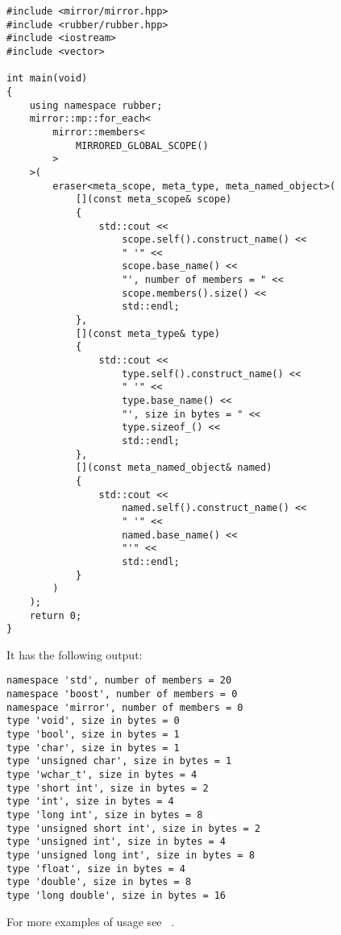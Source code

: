 \begin{verbatim}
#include <mirror/mirror.hpp>
#include <rubber/rubber.hpp>
#include <iostream>
#include <vector>

int main(void)
{
    using namespace rubber;
    mirror::mp::for_each<
        mirror::members<
            MIRRORED_GLOBAL_SCOPE()
        >
    >(
        eraser<meta_scope, meta_type, meta_named_object>(
            [](const meta_scope& scope)
            {
                std::cout <<
                    scope.self().construct_name() <<
                    " '" <<
                    scope.base_name() <<
                    "', number of members = " <<
                    scope.members().size() <<
                    std::endl;
            },
            [](const meta_type& type)
            {
                std::cout <<
                    type.self().construct_name() <<
                    " '" <<
                    type.base_name() <<
                    "', size in bytes = " <<
                    type.sizeof_() <<
                    std::endl;
            },
            [](const meta_named_object& named)
            {
                std::cout <<
                    named.self().construct_name() <<
                    " '" <<
                    named.base_name() <<
                    "'" <<
                    std::endl;
            }
        )
    );
    return 0;
}
\end{verbatim}

It has the following output:

\begin{verbatim}
namespace 'std', number of members = 20
namespace 'boost', number of members = 0
namespace 'mirror', number of members = 0
type 'void', size in bytes = 0
type 'bool', size in bytes = 1
type 'char', size in bytes = 1
type 'unsigned char', size in bytes = 1
type 'wchar_t', size in bytes = 4
type 'short int', size in bytes = 2
type 'int', size in bytes = 4
type 'long int', size in bytes = 8
type 'unsigned short int', size in bytes = 2
type 'unsigned int', size in bytes = 4
type 'unsigned long int', size in bytes = 8
type 'float', size in bytes = 4
type 'double', size in bytes = 8
type 'long double', size in bytes = 16
\end{verbatim}

For more examples of usage see ~\cite{mirror-doc-rubber-examples}.
